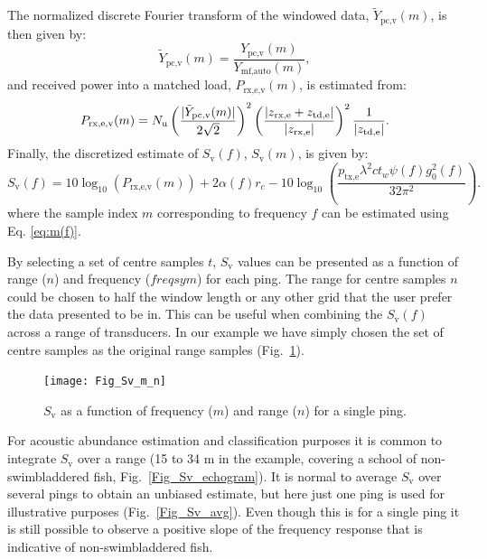 \documentclass[preprint,12pt,TurnOnLineNumbers]{JASAnew}
\newcommand{\timesym}{t}
\newcommand{\freqsym}{f}
\newcommand{\samplesymt}{n}
\newcommand{\samplesymf}{m}
\newcommand{\nchannels}{N_{\textrm{u}}}
\newcommand{\zrxe}{z_{\textrm{rx,e}}}
\newcommand{\ztde}{z_{\textrm{td,e}}}
\newcommand{\ptxe}{p_{\textrm{tx,e}}}
\newcommand{\ypcvolumef}{Y_{\textrm{pc,v}}}
\newcommand{\ypcvolumenormf}{\tilde{Y}_{\textrm{pc,v}}}
\newcommand{\ymfautof}{Y_{\textrm{mf,auto}}}
\newcommand{\prxevf}{P_{\textrm{rx,e,v}}}
\newcommand{\tslide}{t_w}
\newcommand{\sv}{S_{\textrm{v}}}
\newcommand{\range}{r}
\newcommand{\gainzero}{g_0}
\newcommand{\eqang}{\psi}
\newcommand{\wlen}{\lambda}
\newcommand{\cw}{c}
\newcommand{\absorp}{\alpha}
\begin{document}
The normalized discrete Fourier transform of the windowed data, $\ypcvolumenormf(\samplesymf)$, is then given by:
%
\begin{equation}
\label{eq:FFT_volume_norm}
\ypcvolumenormf(\samplesymf) = \frac{\ypcvolumef(\samplesymf)}{\ymfautof(\samplesymf)},
\end{equation}
%
and received power into a matched load, $\prxevf(\samplesymf)$, is estimated from:
%
\begin{equation}
\label{eq:prx_FFT_volume}
\prxevf(\samplesymf) = \nchannels \left( \frac{|\ypcvolumenormf(\samplesymf)|}{2\sqrt{2}} \right)^2 \left( \frac{|\zrxe+\ztde|}{|\zrxe|}\right)^2 \\
\frac{1}{|\ztde|}. %
\end{equation}
%
Finally, the discretized estimate of $\sv(\freqsym)$, $\sv(\samplesymf)$, is given by:
%
\begin{equation}
\label{eq:Sv_FFT}
\sv(\freqsym) = 10\log_{10}(\prxevf(\samplesymf)) + 2\absorp(\freqsym) \range_c - 10\log_{10}\left( \frac{\ptxe \wlen^2 \cw \tslide \eqang(\freqsym) \gainzero^2(\freqsym) }{32\pi^2} \right).
\end{equation}
where the sample index $\samplesymf$ corresponding to frequency $\freqsym$ can be estimated using Eq. {\ref{eq:m(f)}}.

By selecting a set of centre samples $\timesym$, $\sv$ values can be presented as a function of range ($\samplesymt$) and frequency ($freqsym$) for each ping. The range for centre samples $\samplesymt$ could be chosen to half the window length or any other grid that the user prefer the data presented to be in. This can be useful when combining the $\sv(\freqsym)$ across a range of transducers. In our example we have simply chosen the set of centre samples as the original range samples (Fig.~\ref{Fig_Sv_m_n}).

\begin{figure}
\texttt{[image: Fig\_Sv\_m\_n]}
\caption{\label{Fig_Sv_m_n} $\sv$ as a function of frequency ($\samplesymf$) and range ($\samplesymt$) for a single ping.}
\end{figure}

For acoustic abundance estimation and classification purposes it is common to integrate $\sv$ over a range (15 to 34 m in the example, covering a school of non-swimbladdered fish, Fig.~\ref{Fig_Sv_echogram}). It is normal to average $\sv$ over several pings to obtain an unbiased estimate, but here just one ping is used for illustrative purposes (Fig.~\ref{Fig_Sv_avg}). Even though this is for a single ping it is still possible to observe a positive slope of the frequency response that is indicative of non-swimbladdered fish. 
\end{document}
